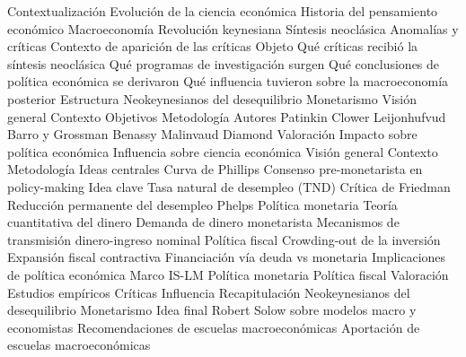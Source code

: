 \documentclass{nuevotema}
\begin{document}
\begin{esquema}[enumerate]
	\1[] 
		\2 Contextualización
			\3 Evolución de la ciencia económica
			\3 Historia del pensamiento económico
			\3 Macroeconomía
			\3 Revolución keynesiana
			\3 Síntesis neoclásica
			\3 Anomalías y críticas
			\3 Contexto de aparición de las críticas
		\2 Objeto
			\3 Qué críticas recibió la síntesis neoclásica
			\3 Qué programas de investigación surgen
			\3 Qué conclusiones de política económica se derivaron
			\3 Qué influencia tuvieron sobre la macroeconomía posterior
		\2 Estructura
			\3 Neokeynesianos del desequilibrio
			\3 Monetarismo
	\1 
		\2 Visión general
			\3 Contexto
			\3 Objetivos
			\3 Metodología
		\2 Autores
			\3 Patinkin
			\3 Clower
			\3 Leijonhufvud
			\3 Barro y Grossman
			\3 Benassy
			\3 Malinvaud
			\3 Diamond
		\2 Valoración
			\3 Impacto sobre política económica
			\3 Influencia sobre ciencia económica
	\1 
		\2 Visión general
			\3 Contexto
			\3 Metodología
			\3 Ideas centrales
		\2 Curva de Phillips
			\3 Consenso pre-monetarista en policy-making
			\3 Idea clave
			\3 Tasa natural de desempleo (TND)
			\3 Crítica de Friedman
			\3 Reducción permanente del desempleo
			\3 Phelps
		\2 Política monetaria
			\3 Teoría cuantitativa del dinero
			\3 Demanda de dinero monetarista
			\3 Mecanismos de transmisión dinero-ingreso nominal
		\2 Política fiscal
			\3 Crowding-out de la inversión
			\3 Expansión fiscal contractiva
			\3 Financiación vía deuda vs monetaria
		\2 Implicaciones de política económica
			\3 Marco IS-LM
			\3 Política monetaria
			\3 Política fiscal
		\2 Valoración
			\3 Estudios empíricos
			\3 Críticas
			\3 Influencia
	\1[] 
		\2 Recapitulación
			\3 Neokeynesianos del desequilibrio
			\3 Monetarismo
		\2 Idea final
			\3 Robert Solow sobre modelos macro y economistas
			\3 Recomendaciones de escuelas macroeconómicas
			\3 Aportación de escuelas macroeconómicas

\end{esquema}

\esquemalargo
\end{document}
